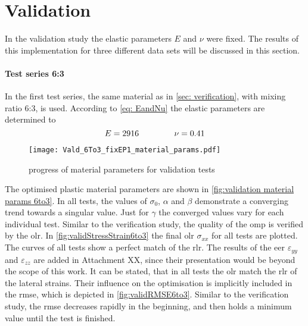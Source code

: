 \newpage
\section{Validation}\label{sec: validation}
 In the validation study the elastic parameters $E$ and $\nu$ were fixed. The results of this implementation for three different data sets will be discussed in this section.
\paragraph{Test series 6:3}
In the first test series, the same material as in \autoref{sec: verification}, with mixing ratio 6:3, is used. According to \autoref{eq: EandNu} the elastic parameters are determined to 
\begin{equation*}
    E = 2916 \hspace{1.5cm} \nu = 0.41 
\end{equation*}

\begin{figure}[H]
    \centering
    \texttt{[image: Vald\_6To3\_fixEP1\_material\_params.pdf]}
    \caption{progress of material parameters for validation tests}
    \label{fig:validation material params 6to3}
\end{figure}

The optimised plastic material parameters are shown in \autoref{fig:validation material params 6to3}.  In all tests, the values of $\sigma_0$, $\alpha$ and $\beta$ demonstrate a converging trend towards a singular value. Just for $\gamma$ the converged values vary for each individual test. Similar to the verification study, the quality of the \acrlong{omp} is verified by the \acrlong{olr}. In \autoref{fig:validStressStrain6to3} the final \acrlong{olr} $\sigma_{xx}$ for all tests are plotted. The curves of all tests show a perfect match of the \acrlong{rlr}. The results of the \acrlong{eer} $\varepsilon_{yy}$ and $\varepsilon_{zz}$ are added in Attachment XX, since their presentation would be beyond the scope of this work. It can be stated, that in all tests the \acrlong{olr} match the \acrlong{rlr} of the lateral strains. Their influence on the optimisation is implicitly included in the \acrshort{rmse}, which is depicted in \autoref{fig:validRMSE6to3}. Similar to the verification study, the \acrshort{rmse} decreases rapidly in the beginning, and then holds a minimum value until the test is finished.



